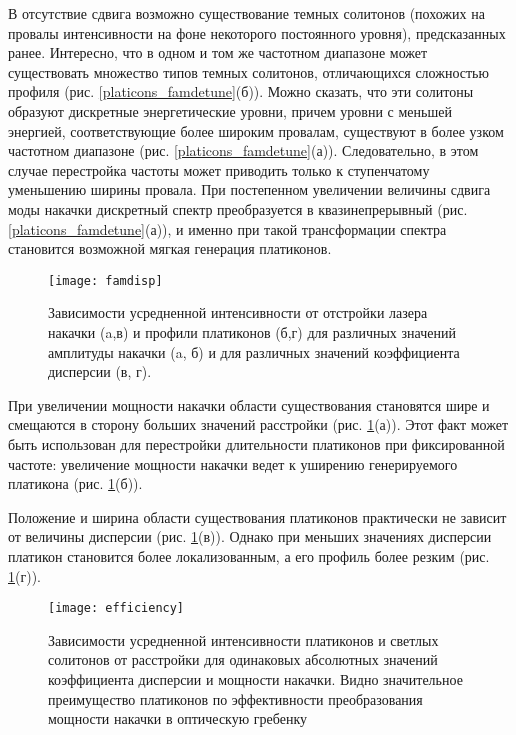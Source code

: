В отсутствие сдвига возможно существование темных солитонов (похожих на провалы интенсивности на фоне некоторого постоянного уровня), предсказанных ранее. Интересно, что в одном и том же частотном диапазоне может существовать множество типов темных солитонов, отличающихся сложностью профиля (рис. \ref{platicons_famdetune}(б)). Можно сказать, что эти солитоны образуют дискретные энергетические уровни, причем уровни с меньшей энергией, соответствующие более широким провалам, существуют в более узком частотном диапазоне (рис. \ref{platicons_famdetune}(а)). Следовательно, в этом случае перестройка частоты может приводить только к ступенчатому уменьшению ширины провала. При постепенном увеличении величины сдвига моды накачки дискретный спектр преобразуется в квазинепрерывный (рис. \ref{platicons_famdetune}(а)), и именно при такой трансформации спектра становится возможной мягкая генерация платиконов.

\begin{figure}
  \centering
  \texttt{[image: famdisp]}
  \caption{Зависимости усредненной интенсивности от отстройки лазера накачки (a,в) и профили платиконов (б,г) для различных значений амплитуды накачки (a, б) и для различных значений коэффициента дисперсии (в, г).} \label{platicons_famdisp}
\end{figure}

При увеличении мощности накачки области существования становятся шире и смещаются в сторону больших значений расстройки (рис. \ref{platicons_famdisp}(а)). Этот факт может быть использован для перестройки длительности платиконов при фиксированной частоте: увеличение мощности накачки ведет к уширению генерируемого платикона (рис. \ref{platicons_famdisp}(б)).

Положение и ширина области существования платиконов практически не зависит от величины дисперсии (рис. \ref{platicons_famdisp}(в)). Однако при меньших значениях дисперсии платикон становится более локализованным, а его профиль более резким (рис. \ref{platicons_famdisp}(г)).

\begin{figure}
  \centering
  \texttt{[image: efficiency]}
  \caption{Зависимости усредненной интенсивности платиконов и светлых солитонов от расстройки для одинаковых абсолютных значений коэффициента дисперсии и мощности накачки. Видно значительное преимущество платиконов по эффективности преобразования мощности накачки в оптическую гребенку} \label{platicons_efficiency}
\end{figure}

